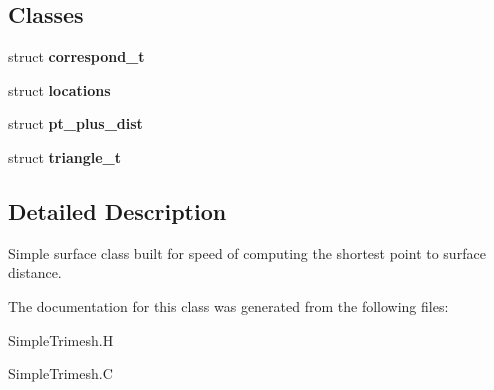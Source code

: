 \subsection*{Classes}
\begin{CompactItemize}
\item 
struct \textbf{correspond\_\-t}
\item 
struct \textbf{locations}
\item 
struct \textbf{pt\_\-plus\_\-dist}
\item 
struct \textbf{triangle\_\-t}
\end{CompactItemize}


\subsection{Detailed Description}
Simple surface class built for speed of computing the shortest point to surface distance. 



The documentation for this class was generated from the following files:\begin{CompactItemize}
\item 
Simple\-Trimesh.H\item 
Simple\-Trimesh.C\end{CompactItemize}
